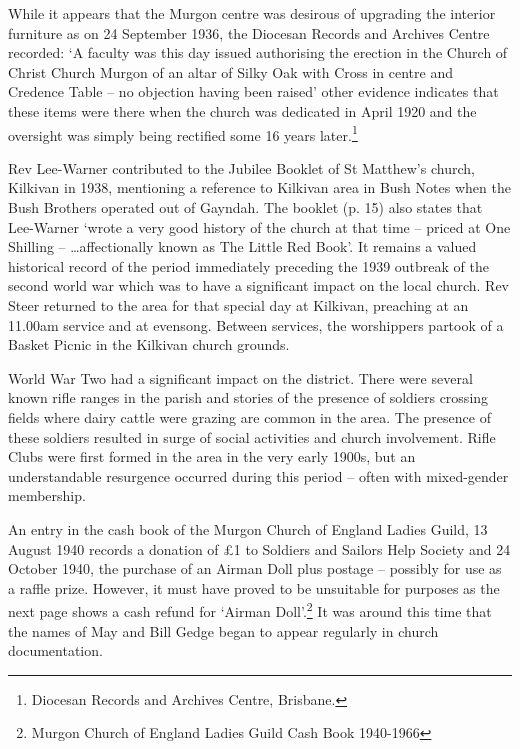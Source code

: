 While it appears that the Murgon centre was desirous of upgrading the
interior furniture as on 24 September 1936, the Diocesan Records and
Archives Centre recorded: `A faculty was this day issued authorising the
erection in the Church of Christ Church Murgon of an altar of Silky Oak
with Cross in centre and Credence Table -- no objection having been
raised' other evidence indicates that these items were there when the
church was dedicated in April 1920 and the oversight was simply being
rectified some 16 years later.\footnote{Diocesan Records and Archives
  Centre, Brisbane.}

Rev Lee-Warner contributed to the Jubilee Booklet of St Matthew's
church, Kilkivan in 1938, mentioning a reference to Kilkivan area in
Bush Notes when the Bush Brothers operated out of Gayndah. The booklet
(p. 15) also states that Lee-Warner `wrote a very good history of the
church at that time -- priced at One Shilling -- \ldots affectionally
known as The Little Red Book'. It remains a valued historical record of
the period immediately preceding the 1939 outbreak of the second world
war which was to have a significant impact on the local church. Rev
Steer returned to the area for that special day at Kilkivan, preaching
at an 11.00am service and at evensong. Between services, the worshippers
partook of a Basket Picnic in the Kilkivan church grounds.

World War Two had a significant impact on the district. There were
several known rifle ranges in the parish and stories of the presence of
soldiers crossing fields where dairy cattle were grazing are common in
the area. The presence of these soldiers resulted in surge of social
activities and church involvement. Rifle Clubs were first formed in the
area in the very early 1900s, but an understandable resurgence occurred
during this period -- often with mixed-gender membership.

An entry in the cash book of the Murgon Church of England Ladies Guild,
13 August 1940 records a donation of £1 to Soldiers and Sailors Help
Society and 24 October 1940, the purchase of an Airman Doll plus postage
-- possibly for use as a raffle prize. However, it must have proved to
be unsuitable for purposes as the next page shows a cash refund for
`Airman Doll'.\footnote{Murgon Church of England Ladies Guild Cash Book
  1940-1966} It was around this time that the names of May and Bill
Gedge began to appear regularly in church documentation.

